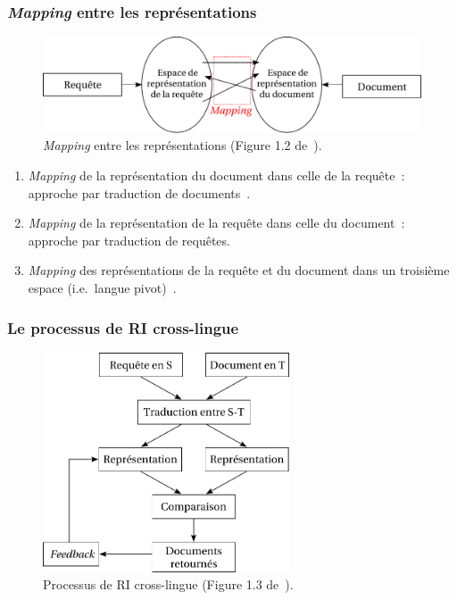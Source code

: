 \documentclass[12pt,aspectratio=43,dvipsnames,table]{beamer}
\begin{document}
\begin{frame}
    \frametitle{\textit{Mapping} entre les représentations}
    \begin{figure}
    \centering
    \includegraphics[width=1\textwidth]{img/mapping.pdf}
    \caption{\textit{Mapping} entre les représentations 
            (Figure 1.2 de~\cite{DBLP:series/synthesis/2010Nie}).}
    \end{figure}
    \vspace*{-1em}
    \begin{enumerate} 
        \item \textit{Mapping} de la représentation du document dans celle de la
              requête~: approche par traduction de documents~\cite{oard1997}.
        \item \textit{Mapping} de la représentation de la requête dans celle du 
              document~: approche par traduction de requêtes.
        \item \textit{Mapping} des représentations de la requête et du document
              dans un troisième espace 
              (i.e.~langue pivot)~\cite{ruiz1999,Kishida:2005}.
    \end{enumerate}
\end{frame}


\begin{frame}
    \frametitle{Le processus de RI cross-lingue}
    \begin{figure}
    \centering
    \includegraphics[width=0.65\textwidth]{img/typicalCLIR.pdf}
    \caption{Processus de RI cross-lingue (Figure 1.3 
             de~\cite{DBLP:series/synthesis/2010Nie}).}
    \end{figure}
\end{frame}
\end{document}
